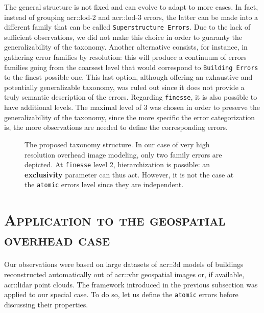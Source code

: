         The general structure is not fixed and can evolve to adapt to more cases.
        In fact, instead of grouping \gls{acr::lod}-2 and \gls{acr::lod}-3 errors, the latter can be made into a different family that can be called \texttt{Superstructure Errors}.
        Due to the lack of sufficient observations, we did not make this choice in order to guaranty the generalizability of the taxonomy.
        Another alternative consists, for instance, in gathering error families by resolution: this will produce a continuum of errors families going from the coarsest level that would correspond to \texttt{Building Errors} to the finest possible one.
        This last option, although offering an exhaustive and potentially generalizable taxonomy, was ruled out since it does not provide a truly semantic description of the errors.
        Regarding \texttt{finesse}, it is also possible to have additional levels.
        The maximal level of 3 was chosen in order to preserve the generalizability of the taxonomy, since the more specific the error categorization is, the more observations are needed to define the corresponding errors.

        \begin{figure}[htbp]
            \begin{center}
                
                \caption{
                    \label{fig::taxonomy} 
                    The proposed taxonomy structure.
                    In our case of very high resolution overhead image modeling, only two family errors are depicted.
                    At \texttt{finesse} level 2, hierarchization is possible: an \textbf{exclusivity} parameter can thus act.
                    However, it is not the case at the \texttt{atomic} errors level since they are independent.
                }
            \end{center}
        \end{figure}

\section{\textsc{Application to the geospatial overhead case}}
    \label{sec::semantic_evaluation::overhead}
    Our observations were based on large datasets of \gls{acr::3d} models of buildings reconstructed automatically out of \gls{acr::vhr} geospatial images or, if available, \gls{acr::lidar} point clouds.
    The framework introduced in the previous subsection was applied to our special case.
    To do so, let us define the \texttt{atomic} errors before discussing their properties.


